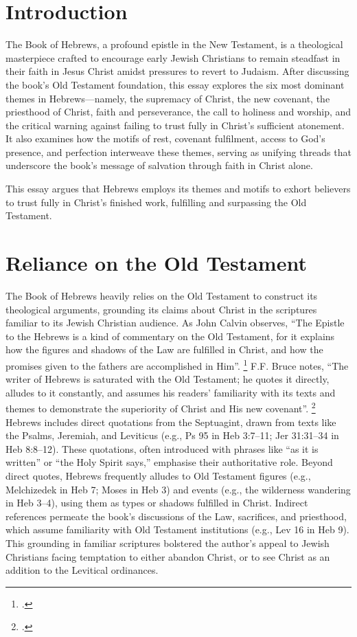 \documentclass[12pt]{article}
\def\jesus{Yeshua}
\def\christ{the Messiah}
\def\jesus{Jesus}
\def\christ{Christ}
\begin{document}
\section{Introduction}
The Book of Hebrews, a profound epistle in the New Testament, is a theological
masterpiece crafted to encourage early Jewish Christians to remain steadfast in
their faith in \jesus{} \christ{} amidst pressures to revert to Judaism. After
discussing the book’s Old Testament foundation, this essay explores the six
most dominant themes in Hebrews---namely, the supremacy of \christ{}, the new
covenant, the priesthood of \christ{}, faith and perseverance, the call to
holiness and worship, and the critical warning against failing to trust fully
in \christ{}’s sufficient atonement. It also examines how the motifs of rest,
covenant fulfilment, access to God’s presence, and perfection interweave these
themes, serving as unifying threads that underscore the book’s message of
salvation through faith in \christ{} alone.

This essay argues that Hebrews employs its themes and motifs to exhort believers
to trust fully in \christ{}’s finished work, fulfilling and surpassing the Old
Testament.

\section{Reliance on the Old Testament}
The Book of Hebrews heavily relies on the Old Testament to construct its
theological arguments, grounding its claims about \christ{} in the scriptures
familiar to its Jewish Christian audience. As John Calvin observes,
``The Epistle to the Hebrews is a kind of commentary on the Old Testament,
for it explains how the figures and shadows of the Law are fulfilled in
\christ{}, and how the promises given to the fathers are accomplished in Him''.
\footcite[7]{Calvin1853}
%
F.F. Bruce notes, ``The writer of Hebrews is saturated with the
Old Testament; he quotes it directly, alludes to it constantly, and assumes his
readers’ familiarity with its texts and themes to demonstrate the superiority
of Christ and His new covenant''. \footcite[14]{Bruce1964}
%
Hebrews includes direct quotations from the Septuagint, drawn from texts like
the Psalms, Jeremiah, and Leviticus (e.g., Ps 95 in Heb 3:7--11; Jer 31:31--34
in Heb 8:8--12).
%
These quotations, often introduced with phrases like ``as it is written'' or
``the Holy Spirit says,'' emphasise their authoritative role.
Beyond direct quotes, Hebrews frequently alludes to Old Testament figures (e.g.,
Melchizedek in Heb 7; Moses in Heb 3) and events (e.g., the wilderness wandering
in Heb 3--4), using them as types or shadows fulfilled in \christ{}.
Indirect references permeate the book’s discussions of the Law, sacrifices, and
priesthood, which assume familiarity with Old Testament institutions (e.g., Lev
16 in Heb 9).
%
This grounding in familiar scriptures bolstered the author’s appeal to Jewish
Christians facing temptation to either abandon \christ{}, or to see \christ{} as
an addition to the Levitical ordinances.
\end{document}
